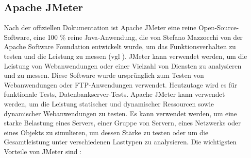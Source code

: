 \subsection{Apache JMeter}


Nach der offiziellen Dokumentation ist Apache JMeter eine reine
Open-Source-Software, eine 100 \% reine Java-Anwendung, die von Stefano
Mazzocchi von der Apache Software Foundation entwickelt wurde, um das
Funktionsverhalten zu testen und die Leistung zu messen (vgl \cite{jmeter}). JMeter kann
verwendet werden, um die Leistung von Webanwendungen oder einer Vielzahl
von Diensten zu analysieren und zu messen. Diese Software wurde ursprünglich zum
Testen von Webanwendungen oder FTP-Anwendungen verwendet. Heutzutage wird
es für funktionale Tests, Datenbankserver-Tests. Apache JMeter kann
verwendet werden, um die Leistung statischer und dynamischer Ressourcen
sowie dynamischer Webanwendungen zu testen. Es kann verwendet werden, um
eine starke Belastung eines Servers, einer Gruppe von Servern, eines
Netzwerks oder eines Objekts zu simulieren, um dessen Stärke zu testen
oder um die Gesamtleistung unter verschiedenen Lasttypen zu analysieren.
Die wichtigsten Vorteile von JMeter sind :

